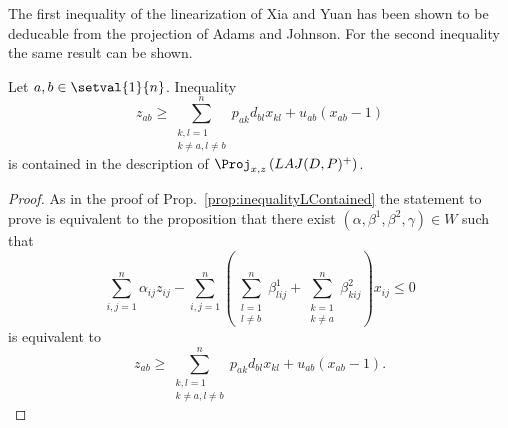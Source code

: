 The first inequality of the linearization of Xia and Yuan has been shown to be deducable from the projection of Adams and Johnson. For the second inequality the same result can be shown.
\begin{proposition}
	\label{prop:inequalityUContained}
	Let $a,b \in\setval{1}{n}$. Inequality
	\begin{equation*}
		z_{ab}\geq \sum_{\substack{k,l=1\\k\neq a, l\neq b}}^np_{ak}d_{bl}x_{kl}+u_{ab}(x_{ab}-1)
	\end{equation*}
	is contained in the description of $\Proj_{x,z}\left(LAJ(D,P)^+\right)$.
\end{proposition}

\begin{proof}
	As in the proof of Prop.~\ref{prop:inequalityLContained} the statement to prove is equivalent to the proposition that there exist $(\alpha, \beta^1, \beta^2, \gamma)\in W$ such that
	\begin{equation*}
		\sum_{i,j=1}^n\alpha_{ij}z_{ij} - \sum_{i,j=1}^n \left(\sum_{\substack{l=1\\l\neq b}}^n \beta^1_{lij} + \sum_{\substack{k=1\\k\neq a}}^n\beta^2_{kij}\right)x_{ij}\leq 0
	\end{equation*}
	is equivalent to
	\begin{equation*}
		z_{ab}\geq \sum_{\substack{k,l=1\\k\neq a, l\neq b}}^np_{ak}d_{bl}x_{kl}+u_{ab}(x_{ab}-1).
	\end{equation*}


\end{proof}
